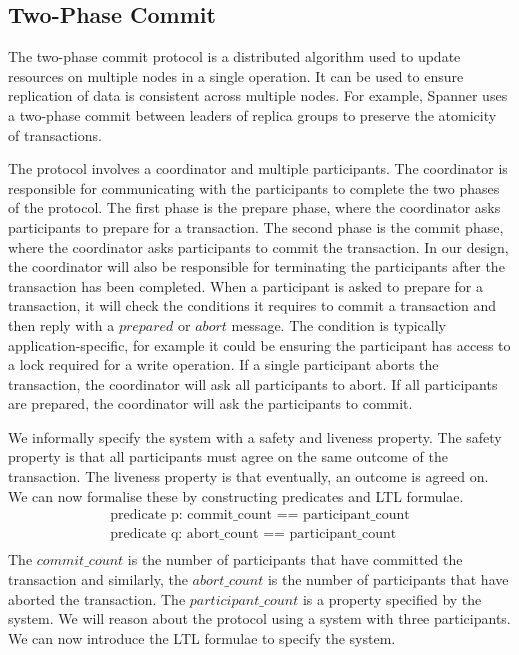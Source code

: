 \subsection{Two-Phase Commit} \label{sec:2pc}
The two-phase commit protocol is a distributed algorithm used to update resources on multiple nodes in a single operation. It can be used to ensure replication of data is consistent across multiple nodes. For example, Spanner \cite{spanner} uses a two-phase commit between leaders of replica groups to preserve the atomicity of transactions.
\par
The protocol involves a coordinator and multiple participants. The coordinator is responsible for communicating with the participants to complete the two phases of the protocol. The first phase is the prepare phase, where the coordinator asks participants to prepare for a transaction. The second phase is the commit phase, where the coordinator asks participants to commit the transaction. In our design, the coordinator will also be responsible for terminating the participants after the transaction has been completed. When a participant is asked to prepare for a transaction, it will check the conditions it requires to commit a transaction and then reply with a $prepared$ or $abort$ message. The condition is typically application-specific, for example it could be ensuring the participant has access to a lock required for a write operation. If a single participant aborts the transaction, the coordinator will ask all participants to abort. If all participants are prepared, the coordinator will ask the participants to commit.
\par
We informally specify the system with a safety and liveness property. The safety property is that all participants must agree on the same outcome of the transaction. The liveness property is that eventually, an outcome is agreed on. We can now formalise these by constructing predicates and LTL formulae.
\[
\begin{array}{l}
\text{predicate p: commit\_count == participant\_count} \\
\text{predicate q: abort\_count == participant\_count} \\
\end{array}
\]
The $commit\_count$ is the number of participants that have committed the transaction and similarly, the $abort\_count$ is the number of participants that have aborted the transaction. The $participant\_count$ is a property specified by the system. We will reason about the protocol using a system with three participants. We can now introduce the LTL formulae to specify the system.
